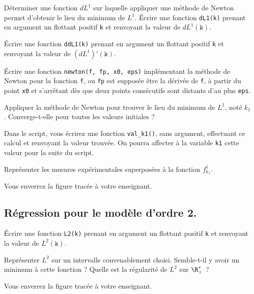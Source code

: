 \medskip{}

\question{} Déterminer une fonction $dL^1$ sur laquelle appliquer une méthode de Newton permet d'obtenir le lieu du minimum de $L^1$. 
Écrire une fonction \texttt{dL1(k)} prenant en argument un flottant positif \texttt{k} et renvoyant la valeur de $dL^1(\texttt k)$.

\medskip{}

\question{} Écrire une fonction \texttt{ddL1(k)} prenant en argument un flottant positif \texttt{k} et renvoyant la valeur de $(dL^1)'(\texttt k)$.

\medskip{}

\question{} \'Ecrire une fonction \texttt{newton(f, fp, x0, eps)} implémentant la méthode de Newton pour la fonction \texttt{f}, ou \texttt{fp} est supposée être la dérivée de \texttt{f}, à partir du point \texttt{x0} et s'arrêtant dès que deux points consécutifs sont distants d'au plus \texttt{eps}.

\medskip{}

\question{} Appliquer la méthode de Newton pour trouver le lieu du minimum de $L^1$, noté $k_1$. Converge-t-elle pour toutes les valeurs initiales ? 

Dans le script, vous écrirez une fonction \texttt{val\_k1()}, sans argument, effectuant ce calcul et renvoyant la valeur trouvée. On pourra affecter à la variable \texttt{k1} cette valeur pour la suite du script.

\question{\label{qu:tracef1}} Représenter les mesures expérimentales superposées à la fonction $f^1_{k_1}$.

  Vous enverrez la figure tracée à votre enseignant. 


\subsection*{Régression pour le modèle d'ordre 2.}
\label{sec.reg.o2}

\question{} Écrire une fonction \texttt{L2(k)} prenant en argument un flottant positif \texttt{k} et renvoyant la valeur de $L^2(\texttt k)$.

\medskip{}

\question{\label{qu:traceL2}} Représenter $L^2$ sur un intervalle convenablement choisi. Semble-t-il y avoir un minimum à cette fonction ? Quelle est la régularité de $L^2$ sur $\R^\ast_+$ ?

  Vous enverrez la figure tracée à votre enseignant. 

\medskip{}  
  
